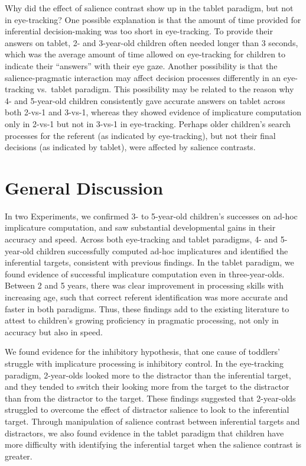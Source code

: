 \documentclass[a4paper,man,apacite,floatsintext]{apa6}
\begin{document}
Why did the effect of salience contrast show up in the tablet paradigm,
but not in eye-tracking? One possible explanation is that the amount of
time provided for inferential decision-making was too short in
eye-tracking. To provide their answers on tablet, 2- and 3-year-old
children often needed longer than 3 seconds, which was the average
amount of time allowed on eye-tracking for children to indicate their
``answers'' with their eye gaze. Another possibility is that the
salience-pragmatic interaction may affect decision processes differently
in an eye-tracking vs.~tablet paradigm. This possibility may be related
to the reason why 4- and 5-year-old children consistently gave accurate
answers on tablet across both 2-vs-1 and 3-vs-1, whereas they showed
evidence of implicature computation only in 2-vs-1 but not in 3-vs-1 in
eye-tracking. Perhaps older children's search processes for the referent
(as indicated by eye-tracking), but not their final decisions (as
indicated by tablet), were affected by salience contrasts.

\section{General Discussion}\label{general-discussion}

In two Experiments, we confirmed 3- to 5-year-old children's successes
on ad-hoc implicature computation, and saw substantial developmental
gains in their accuracy and speed. Across both eye-tracking and tablet
paradigms, 4- and 5-year-old children successfully computed ad-hoc
implicatures and identified the inferential targets, consistent with
previous findings. In the tablet paradigm, we found evidence of
successful implicature computation even in three-year-olds. Between 2
and 5 years, there was clear improvement in processing skills with
increasing age, such that correct referent identification was more
accurate and faster in both paradigms. Thus, these findings add to the
existing literature to attest to children's growing proficiency in
pragmatic processing, not only in accuracy but also in speed.

We found evidence for the inhibitory hypothesis, that one cause of
toddlers' struggle with implicature processing is inhibitory control. In
the eye-tracking paradigm, 2-year-olds looked more to the distractor
than the inferential target, and they tended to switch their looking
more from the target to the distractor than from the distractor to the
target. These findings suggested that 2-year-olds struggled to overcome
the effect of distractor salience to look to the inferential target.
Through manipulation of salience contrast between inferential targets
and distractors, we also found evidence in the tablet paradigm that
children have more difficulty with identifying the inferential target
when the salience contrast is greater.
\end{document}
